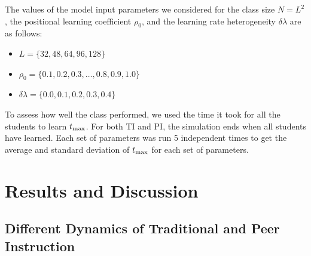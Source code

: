 \documentclass[twocolumn,secnumarabic,amssymb, nobibnotes, aps, prd]{revtex4-2}
\begin{document}

    The values of the model input parameters we considered for the class size $N=L^2$, the positional learning coefficient $\rho_0$, and the learning rate heterogeneity $\delta\lambda$ are as follows:

        \begin{itemize}
            \item $L=\lbrace32,48,64,96,128\rbrace$
            \item $\rho_0=\lbrace0.1, 0.2, 0.3,\dots, 0.8, 0.9, 1.0\rbrace$
            \item $\delta\lambda=\lbrace0.0, 0.1, 0.2, 0.3, 0.4\rbrace$
        \end{itemize}

        To assess how well the class performed, we used the time it took for all the students to learn $t_{\rm max}$.
        For both TI and PI, the simulation ends when all students have learned.
        Each set of parameters was run 5 independent times to get the average and standard deviation of $t_{\rm max}$ for each set of parameters.




\section{Results and Discussion}

    \subsection{Different Dynamics of Traditional and Peer Instruction}
        
\end{document}
